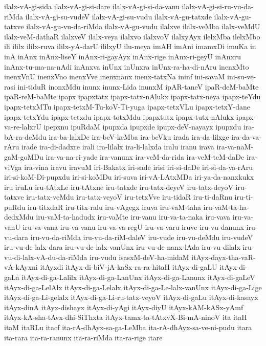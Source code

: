 {ilalx-vA-gi-sida
ilalx-vA-gi-si-dare
ilalx-vA-gi-si-da-vanu
ilalx-vA-gi-si-ru-vu-da-riMda
ilalx-vA-gi-su-vudeV
ilalx-vA-gi-su-vudu
ilalx-vA-gu-tatxde
ilalx-vA-gu-tatxve
ilalx-vA-gu-vu-da-riMda
ilalx-vA-gu-vudu
ilalxve
ilalx-veMba
ilalx-veMdU
ilalx-veM-dathaR
ilalxveV
ilalx-veya
ilalxvo
ilalxvoV
ilalxyAyx
ilelxMba
ilelxMbo
ili
ililx
ililx-ruva
ililx-yA-darU
ililxyU
ilu-meya
imAH
imAni
imamxDi
imuKa
in
inA
inAnx
inAnx-liseY
inAnx-ri-gayAyx
inAnx-rige
inAnx-ri-geyU
inAnxru
inAnx-tu-ma-na-nAdi
inAnxva
inUnx
inUnxra
inUnx-ra-ha-di-nAru
inenxMto
inenxVnU
inenxVno
inenxVve
inenxnanx
inenx-tatxNa
ininf
ini-savaM
ini-su-ve-rasi
ini-tiduR
inonxMdu
inunx
inunx-Lida
inunxM
ipAR-taneV
ipaR-deM-baMte
ipaR-reM-baMte
ipapx
ipapxtatx
ipapx-tatx-nAlukx
ipapx-tatx-neya
ipapx-teYdu
ipapx-tetxMTu
ipapx-tetxM-Tu-koV-Ti-yuga
ipapx-tetxVLu
ipapx-tetxY-dane
ipapx-tetxYdu
ipapx-tetxdu
ipapx-totxMdu
ipapxtutx
ipapx-tutx-nAlukx
ipapx-va-re-lalxrU
ipepxnu
ipuRdaM
ipupxda
ipupxde
ipupx-deV-nayayx
ipupxdu
ira-bA-ra-deMdu
ira-ba-lalxDe
ira-beV-keMba
ira-beVku
irada
ira-da-lilxge
ira-da-va-rAru
irade
ira-di-dadxre
irali
ira-lilalx
ira-li-lalxda
iralu
iranu
irava
ira-va-naM-gaM-goMDu
ira-va-na-ri-yade
ira-vanunx
ira-veM-da-rida
ira-veM-teM-daDe
ira-viVga
ira-vina
iravu
iravuM
iri-Bakatx
iri-sade
irisi
iri-si-daDe
iri-si-da-va-rAru
iri-si-koM-Di-pupxdu
iri-si-koMDu
iri-suva
iri-vA-LAtxMDa
iri-ya-da-nanxkukx
iru
iruLu
iru-tAtxLe
iru-tAtxne
iru-tatxde
iru-tatx-deyeV
iru-tatx-deyoV
iru-tatxve
iru-tatx-veMdu
iru-tatx-veyoV
iru-tetxVve
iru-tidaR
iru-ti-daRnu
iru-ti-puRdu
iru-titxdaR
iru-titx-ralu
iru-vAgegx
iruva
iru-vaM-taha
iru-vaM-ta-ha-dedxMdu
iru-vaM-ta-hadudx
iru-vaMte
iru-vanu
iru-va-ta-naka
iru-vava
iru-va-vanU
iru-va-vana
iru-va-vanu
iru-va-va-regU
iru-va-varu
iruve
iru-vu-danunx
iru-vu-dara
iru-vu-da-riMda
iru-vu-da-riM-daleV
iru-vude
iru-vu-deMdu
iru-vudeV
iru-vu-de-lalx-dara
iru-vu-de-lalx-vanUnx
iru-vu-de-nanx-lAda
iru-vu-dilalx
iru-vu-di-lalx-vA-du-da-riMda
iru-vudu
isasxM-deV-ha-midaM
itAyx-dayx-tha-vaR-vA-kAyxni
itAyxdi
itAyx-di-biV-jA-kaSx-ra-ra-hitaH
itAyx-di-gaLU
itAyx-di-gaLa
itAyx-di-ga-Lalilx
itAyx-di-ga-LanUnx
itAyx-di-ga-Lanunx
itAyx-di-gaLeV
itAyx-di-ga-LelAlx
itAyx-di-ga-Lelalx
itAyx-di-ga-Le-lalx-vanUnx
itAyx-di-ga-Lige
itAyx-di-ga-Li-gelalx
itAyx-di-ga-Li-ru-tatx-veyoV
itAyx-di-gaLu
itAyx-di-kasayx
itAyx-dinA
itAyx-dishayx
itAyx-di-yAgi
itAyx-diyU
itAyx-kAM-kASx-yAmf
itAyx-kA-sha-tAvx-dhi-SiThxta
itAyx-tamx-ta-tAtxvX-Bi-mA-ninoV
ita
itaH
itaM
itaRLu
itacf
ita-rA-dhAyx-sa-ga-LeMba
ita-rA-dhAyx-sa-ve-ni-pudu
itara
ita-rara
ita-ra-ranunx
ita-ra-riMda
ita-ra-rige
itare
}
